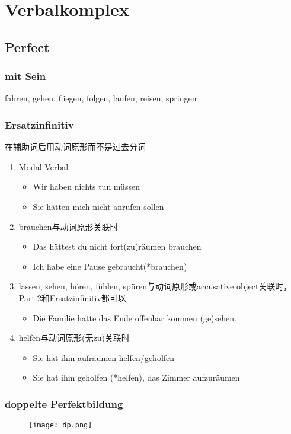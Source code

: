 \documentclass[UTF8]{report}
\begin{document}
\section{Verbalkomplex}
\subsection{Perfect}
\subsubsection{mit Sein}
fahren, gehen, fliegen, folgen, laufen, reisen, springen

\subsubsection{Ersatzinfinitiv}
在辅助词后用动词原形而不是过去分词
\begin{enumerate}
    \item Modal Verbal
    \begin{itemize}
        \item Wir haben nichts tun müssen
        \item Sie hätten mich nicht anrufen sollen
    \end{itemize} 
    \item brauchen与动词原形关联时
    \begin{itemize}
        \item Das hättest du nicht fort(zu)räumen brauchen
        \item Ich habe eine Pause gebraucht(*brauchen)
    \end{itemize}
    \item lassen, sehen, hören, fühlen, spüren与动词原形或accusative object关联时，Part.2和Ersatzinfinitiv都可以
    \begin{itemize}
        \item Die Familie hatte das Ende offenbar kommen (ge)sehen.
    \end{itemize}
    \item helfen与动词原形(无zu)关联时
    \begin{itemize}
        \item Sie hat ihm aufräumen helfen/geholfen
        \item Sie hat ihm geholfen (*helfen), das Zimmer aufzuräumen
    \end{itemize}
\end{enumerate}

\subsubsection{doppelte Perfektbildung}
\begin{figure}[H]
    \centering
    \texttt{[image: dp.png]}
\end{figure}
\end{document}

